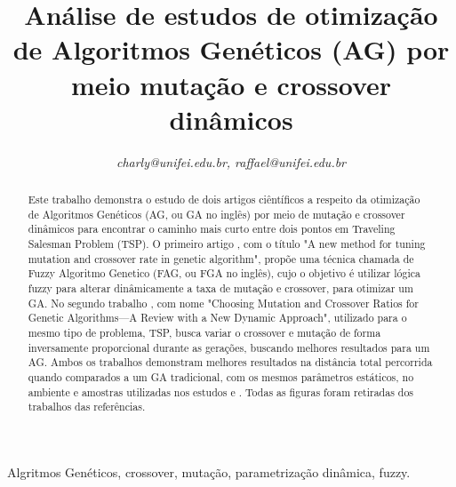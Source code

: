 \documentclass[conference]{IEEEtran}
\begin{document}
\title{Análise de estudos de otimização de Algoritmos Genéticos (AG) por meio mutação e crossover dinâmicos}



\author{
	\textit{charly@unifei.edu.br, raffael@unifei.edu.br}}

\maketitle

\begin{abstract}
Este trabalho demonstra o estudo de dois artigos ciêntíficos a respeito da otimização de Algoritmos Genéticos (AG, ou GA no inglês) por meio de mutação e crossover dinâmicos para encontrar o caminho mais curto entre dois pontos em Traveling Salesman Problem (TSP). O primeiro artigo \cite{fga}, com o título "A  new  method  for  tuning  mutation  and crossover rate in genetic algorithm", propõe uma técnica chamada de Fuzzy Algoritmo Genetico (FAG, ou FGA no inglês), cujo o objetivo é utilizar lógica fuzzy para alterar dinâmicamente a taxa de mutação e crossover, para otimizar um GA. No segundo trabalho \cite{m-c}, com nome "Choosing Mutation and Crossover Ratios for Genetic Algorithms—A Review with a New Dynamic Approach", utilizado para o mesmo tipo de problema, TSP, busca variar o crossover e mutação de forma inversamente proporcional durante as gerações, buscando melhores resultados para um AG. Ambos os trabalhos demonstram melhores resultados na distância total percorrida quando comparados a um GA tradicional, com os mesmos parâmetros estáticos, no ambiente e amostras  utilizadas nos estudos \cite{fga} e \cite{m-c}. Todas as figuras foram retiradas dos trabalhos das referências.


\end{abstract}
\renewcommand\IEEEkeywordsname{Keywords}
\begin{IEEEkeywords}
Algritmos Genéticos, crossover, mutação, parametrização dinâmica, fuzzy.
\end{IEEEkeywords}
\end{document}
